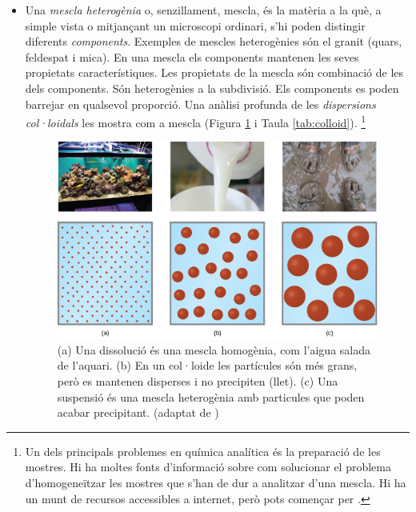 \begin{itemize}
\item Una \emph{mescla heterogènia} o, senzillament, mescla, és la matèria a la què, a simple vista o mitjançant un microscopi ordinari, s'hi poden distingir diferents \emph{components}. Exemples de mescles heterogènies són el granit (quars, feldespat i mica). En una mescla els components mantenen les seves propietats característiques. Les propietats de la mescla són combinació de les dels components. Són heterogènies a la subdivisió. Els components es poden barrejar en qualsevol proporció. Una anàlisi profunda de les \emph{dispersions col·loidals} les mostra com a mescla (Figura \ref{fig:Colloid} i Taula \ref{tab:colloid}). \footnote{Un dels principals problemes en química analítica és la preparació de les mostres. Hi ha moltes fonts d'informació sobre com solucionar el problema d'homogeneïtzar les mostres que s'han de dur a analitzar d'una mescla. Hi ha un munt de recursos accessibles a internet, però pots començar per .}
\begin{figure}[h]
\centering
\includegraphics[scale=0.8]{figures/Colloid.png}
\caption[Dissolucions, suspensions i col·loides]{(a) Una dissolució és una mescla homogènia, com l'aigua salada de l'aquari. (b) En un col·loide les partícules són més grans, però es mantenen disperses i no precipiten (llet). (c) Una suspensió és una mescla heterogènia amb particules que poden acabar precipitant. (adaptat de \cite{Colloids2016})}
\label{fig:Colloid}
\end{figure}


\end{itemize}
